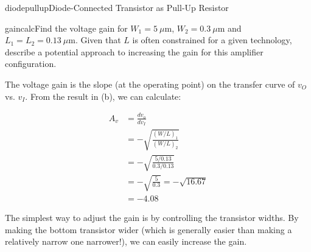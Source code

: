 \begin{mainquestion}{diodepullup}{Diode-Connected Transistor as Pull-Up Resistor}
\begin{partquestion}{gaincalc}{Find the voltage gain for $W_{1} = 5\ \mu\text{m}$, $W_{2} = 0.3\ \mu\text{m}$ and $L_{1} = L_{2} = 0.13\ \mu\text{m}$. Given that $L$ is often constrained for a given technology, describe a potential approach to increasing the gain for this amplifier configuration.}
\begin{answer}
The voltage gain is the slope (at the operating point) on the transfer curve of $v_{O}$ vs. $v_{I}$. From the result in (b), we can calculate:

\begin{align*}
    A_v &= \frac{d v_o}{d v_I} \\
    &= - \sqrt{\frac{(W / L)_1}{(W / L)_2}} \\
    &= - \sqrt{\frac{5/0.13}{0.3/0.13}} \\
    &= - \sqrt{\frac{5}{0.3}} = - \sqrt{16.67}\\
    &= - 4.08
\end{align*}

The simplest way to adjust the gain is by controlling the transistor widths. By making the bottom transistor wider (which is generally easier than making a relatively narrow one narrower!), we can easily increase the gain.
\end{answer}
\end{partquestion}

\end{mainquestion}
